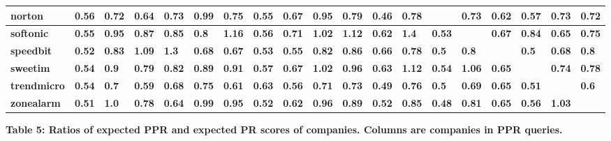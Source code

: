 \documentclass{article} %
\begin{document}
\begin{tabular}{|p{0.5in}|p{0.2in}|p{0.2in}|p{0.2in}|p{0.2in}|p{0.2in}|p{0.2in}|p{0.2in}|p{0.2in}|p{0.2in}|p{0.2in}|p{0.2in}|p{0.2in}|p{0.2in}|p{0.2in}|p{0.2in}|p{0.2in}|p{0.2in}|p{0.2in}|}
\textbf{norton} & \textbf{0.56} & \textbf{0.72} & \textbf{0.64} & \textbf{0.73} & \textbf{0.99} & \textbf{0.75} & \textbf{0.55} & \textbf{0.67} & \textbf{0.95} & \textbf{0.79} & \textbf{0.46} & \textbf{0.78} & \textbf{} & \textbf{0.73} & \textbf{0.62} & \textbf{0.57} & \textbf{0.73} & \textbf{0.72} \\ \hline 
\textbf{softonic} & \textbf{0.55} & \textbf{0.95} & \textbf{0.87} & \textbf{0.85} & \textbf{0.8} & \textbf{1.16} & \textbf{0.56} & \textbf{0.71} & \textbf{1.02} & \textbf{1.12} & \textbf{0.62} & \textbf{1.4} & \textbf{0.53} & \textbf{} & \textbf{0.67} & \textbf{0.84} & \textbf{0.65} & \textbf{0.75} \\ \hline 
\textbf{speedbit} & \textbf{0.52} & \textbf{0.83} & \textbf{1.09} & \textbf{1.3} & \textbf{0.68} & \textbf{0.67} & \textbf{0.53} & \textbf{0.55} & \textbf{0.82} & \textbf{0.86} & \textbf{0.66} & \textbf{0.78} & \textbf{0.5} & \textbf{0.8} & \textbf{} & \textbf{0.5} & \textbf{0.68} & \textbf{0.8} \\ \hline 
\textbf{sweetim} & \textbf{0.54} & \textbf{0.9} & \textbf{0.79} & \textbf{0.82} & \textbf{0.89} & \textbf{0.91} & \textbf{0.57} & \textbf{0.67} & \textbf{1.02} & \textbf{0.96} & \textbf{0.63} & \textbf{1.12} & \textbf{0.54} & \textbf{1.06} & \textbf{0.65} & \textbf{} & \textbf{0.74} & \textbf{0.78} \\ \hline 
\textbf{trendmicro} & \textbf{0.54} & \textbf{0.7} & \textbf{0.59} & \textbf{0.68} & \textbf{0.75} & \textbf{0.61} & \textbf{0.63} & \textbf{0.56} & \textbf{0.71} & \textbf{0.73} & \textbf{0.49} & \textbf{0.76} & \textbf{0.5} & \textbf{0.69} & \textbf{0.65} & \textbf{0.51} & \textbf{} & \textbf{0.6} \\ \hline 
\textbf{zonealarm} & \textbf{0.51} & \textbf{1.0} & \textbf{0.78} & \textbf{0.64} & \textbf{0.99} & \textbf{0.95} & \textbf{0.52} & \textbf{0.62} & \textbf{0.96} & \textbf{0.89} & \textbf{0.52} & \textbf{0.85} & \textbf{0.48} & \textbf{0.81} & \textbf{0.65} & \textbf{0.56} & \textbf{1.03} & \textbf{} \\ \hline 
\end{tabular}

\textbf{Table 5: Ratios of expected PPR and expected PR scores of companies. Columns are companies in PPR queries.}

\noindent 
\end{document}
